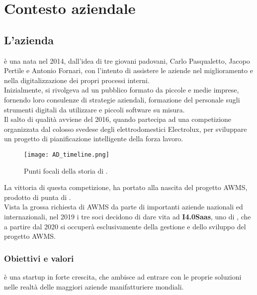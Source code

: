 \cleardoublepage
\chapter{Contesto aziendale}
\label{cap:introduzione}

\section{L'azienda}
\AD{} è una  nata nel 2014, dall'idea di tre giovani padovani, Carlo Pasqualetto, Jacopo Pertile e Antonio Fornari, con l'intento di assistere le aziende nel miglioramento e nella digitalizzazione dei propri processi interni.\\
Inizialmente, \AD{} si rivolgeva ad un pubblico formato da piccole e medie imprese, fornendo loro consulenze di strategie aziendali, formazione del personale sugli strumenti digitali da utilizzare e piccoli software su misura.\\
Il salto di qualità avviene del 2016, quando \AD{} partecipa ad una competizione organizzata dal colosso svedese degli elettrodomestici Electrolux, per sviluppare un progetto di pianificazione intelligente della forza lavoro.

\begin{figure}[h]

\texttt{[image: AD\_timeline.png]}
\centering
\caption{Punti focali della storia di \AD{}.}
\label{fig:timeline}
\end{figure}
La vittoria di questa competizione, ha portato alla nascita del progetto AWMS, prodotto di punta di \AD{}.\\
Vista la grossa richiesta di AWMS da parte di importanti aziende nazionali ed internazionali, nel 2019 i tre soci decidono di dare vita ad \textbf{I4.0Saas}, uno  di \AD{}, che a partire dal 2020 si occuperà esclusivamente della gestione e dello sviluppo del progetto AWMS.\\

\subsection{Obiettivi e valori}
\AD{} è una \gls{startup} in forte crescita, che ambisce ad entrare con le proprie soluzioni nelle realtà delle maggiori aziende manifatturiere mondiali.

